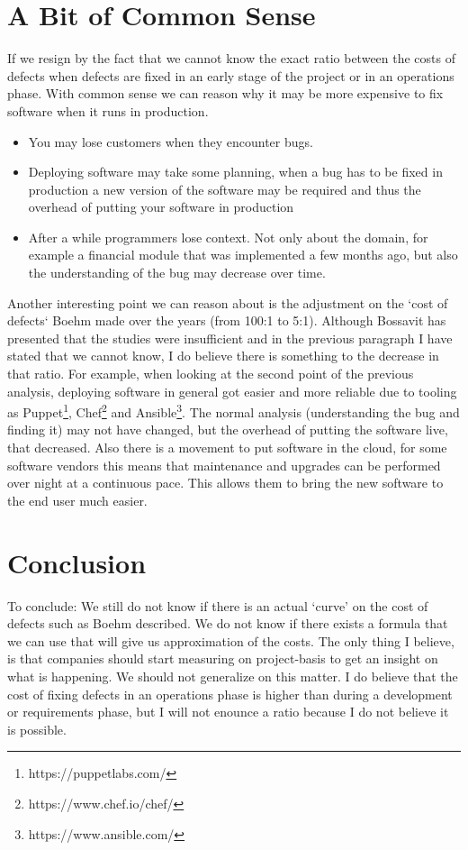 \section*{A Bit of Common Sense}

If we resign by the fact that we cannot know the exact ratio between the costs of defects when defects are fixed in an early stage of the project or in an operations phase.
With common sense we can reason why it may be more expensive to fix software when it runs in production.

\begin{itemize}[noitemsep]
\item You may lose customers when they encounter bugs.
\item Deploying software may take some planning, when a bug has to be fixed in production a new version of the software may be required and thus the overhead of putting your software in production
\item After a while programmers lose context. Not only about the domain, for example a financial module that was implemented a few months ago, but also the understanding of the bug may decrease over time.
\end{itemize}

Another interesting point we can reason about is the adjustment on the `cost of defects` Boehm made over the years (from 100:1 to 5:1).
Although Bossavit has presented that the studies were insufficient and in the previous paragraph I have stated that we cannot know,
I do believe there is something to the decrease in that ratio.
For example, when looking at the second point of the previous analysis, deploying software in general got easier and more reliable due to tooling as Puppet\footnote{https://puppetlabs.com/}, Chef\footnote{https://www.chef.io/chef/} and Ansible\footnote{https://www.ansible.com/}.
The normal analysis (understanding the bug and finding it) may not have changed, but the overhead of putting the software live, that decreased.
Also there is a movement to put software in the cloud, for some software vendors this means that maintenance and upgrades can be performed over night at a continuous pace.
This allows them to bring the new software to the end user much easier.

\section*{Conclusion}

To conclude: We still do not know if there is an actual `curve' on the cost of defects such as Boehm described.
We do not know if there exists a formula that we can use that will give us approximation of the costs.
The only thing I believe, is that companies should start measuring on project-basis to get an insight on what is happening.
We should not generalize on this matter.
I do believe that the cost of fixing defects in an operations phase is higher than during a development or requirements phase,
but I will not enounce a ratio because I do not believe it is possible.